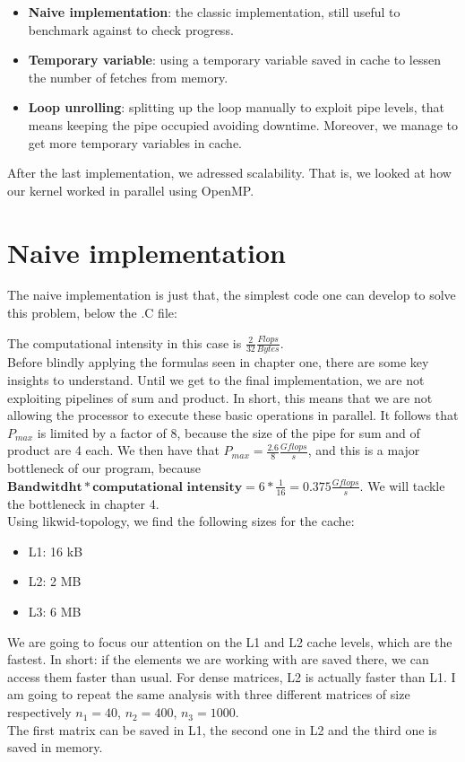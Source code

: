 \documentclass[11pt,a4paper,oneside,titlepage,openright]{book}
\begin{document}
\begin{itemize}
\item \textbf{Naive implementation}: the classic implementation, still useful to benchmark against to check progress. 
\item \textbf{Temporary variable}: using a temporary variable saved in cache to  lessen the number of fetches from memory. 
\item \textbf{Loop unrolling}: splitting up the loop manually to exploit pipe levels, that means keeping the pipe occupied avoiding  downtime. Moreover, we manage to get more temporary variables in cache.
\end{itemize}
After the last implementation, we adressed scalability. That is, we looked at how our kernel worked in parallel using OpenMP.




\chapter{Naive implementation}

The naive implementation is just that, the simplest code one can develop to solve this problem, below the .C file:

The computational intensity in this case is $\frac{2}{32}\frac{Flops}{Bytes}$. 
\\Before blindly applying the formulas seen in chapter one, there are some key insights to understand. Until we get to the final implementation, we are not exploiting pipelines of sum and product. In short, this means that we are not allowing the processor to execute these basic operations in parallel. It follows that $P_{max}$ is limited by a factor of $8$, because the size of the pipe for sum and of product are 4 each.
We then have that $P_{max}= \frac{2.6}{8} \frac{Gflops}{s} $, and this is a major bottleneck of our program, because $\textbf{Bandwitdht} * \textbf{computational intensity} = 6*\frac{1}{16} = 0.375 \frac{Gflops}{s} $. We will tackle the bottleneck in chapter 4.\\
Using likwid-topology, we find the following sizes for the cache: 
\begin{itemize}
\item L1: 16 kB
\item L2: 2 MB
\item L3: 6 MB
\end{itemize}
We are going to focus our attention on the L1 and L2 cache levels, which are the fastest. In short: if the elements we are working with are saved there, we can access them faster than usual.  For dense matrices, L2 is actually faster than L1. I am going to repeat the same analysis with three different matrices of size respectively $n_1 = 40$, $n_2 = 400$, $n_3 = 1000$.\\
The first matrix can be saved in L1, the second one in L2 and the third one is saved in memory.  
\end{document}
